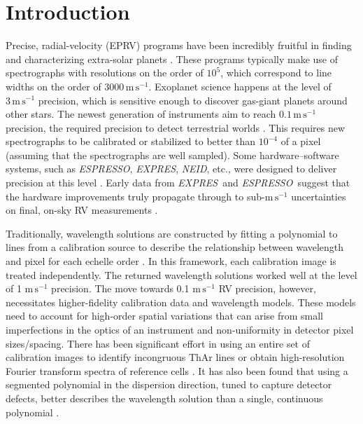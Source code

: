 \documentclass[modern]{aastex63}
\newcommand{\project}[1]{\textsl{#1}}
\newcommand{\acronym}[1]{{\small{#1}}}
\newcommand{\expres}{\project{\acronym{EXPRES}}}
\newcommand{\espresso}{\project{\acronym{ESPRESSO}}}
\newcommand{\neid}{\project{\acronym{NEID}}}
\newcommand{\eprv}{\acronym{EPRV}}
\newcommand{\mps}{\mathrm{m\,s^{-1}}}
\begin{document}

\section{Introduction} 
Precise, radial-velocity (\eprv) programs have been incredibly fruitful in finding and characterizing extra-solar planets \citep[e.g.][]{mayor2011, bonfils2013, plavchan2015, butler2017}.  These programs typically make use of spectrographs with resolutions on the order of $10^5$, which correspond to line widths on the order of $3000\,\mps$.  Exoplanet science happens at the level of $3\,\mps$ precision, which is sensitive enough to discover gas-giant planets around other stars.  The newest generation of instruments aim  to reach $0.1\,\mps$ precision, the required precision to detect terrestrial worlds \citep{fischer2016}.  This requires new spectrographs to be calibrated or stabilized to better than $10^{-4}$ of a pixel (assuming that the spectrographs are well sampled).    Some hardware--software systems, such as \espresso, \expres,  \neid, etc., were designed to deliver precision at this level \citep{pepe2013,  jurgenson2016, neid}.  Early data from \expres\ and \espresso\ suggest that the hardware improvements truly propagate through to sub-$\mps$ uncertainties on final, on-sky RV measurements \citep{blackman2020, petersburg2020, mascareno2020}.

Traditionally, wavelength solutions are constructed by fitting a polynomial to lines from a calibration source to describe the relationship between wavelength and pixel for each echelle order \citep{butler1996, lovis2007, cersullo2019}.  In this framework, each calibration image is treated independently.  The returned wavelength solutions worked well at the level of 1 $\mps$ precision.  The move towards 0.1 $\mps$ RV precision, however, necessitates higher-fidelity calibration data and wavelength models.  These models need to account for high-order spatial variations that can arise from small imperfections in the optics of an instrument and non-uniformity in detector pixel sizes/spacing.  There has been significant effort in using an entire set of calibration images to identify incongruous ThAr lines \citep{coffinet2019} or obtain high-resolution Fourier transform spectra of reference cells \citep{wang2020}.  It has also been found that using a segmented polynomial in the dispersion direction, tuned to capture detector defects, better describes the wavelength solution than a single, continuous polynomial \citep{milakovic2020}.
\end{document}
